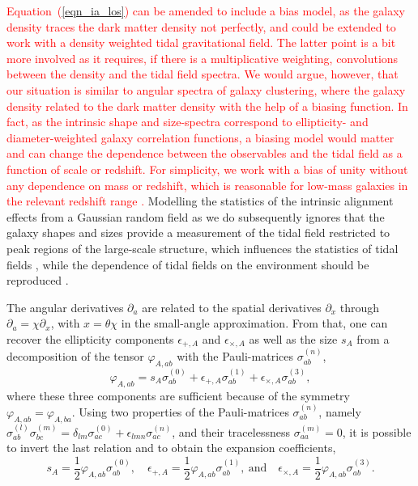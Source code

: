 \documentclass[a4paper,fleqn,usenatbib]{mnras}
\newcommand\spirou[1]{\textcolor{red}{#1}}
\begin{document}
\spirou{Equation~(\ref{eqn_ia_los}) can be amended to include a bias model, as the galaxy density traces the dark matter density not perfectly, and could be extended to work with a density weighted tidal gravitational field. The latter point is a bit more involved as it requires, if there is a multiplicative weighting, convolutions between the density and the tidal field spectra. We would argue, however, that our situation is similar to angular spectra of galaxy clustering, where the galaxy density related to the dark matter density with the help of a biasing function. In fact, as the intrinsic shape and size-spectra correspond to ellipticity- and diameter-weighted galaxy correlation functions, a biasing model would matter and can change the dependence between the observables and the tidal field as a function of scale or redshift. For simplicity, we work with a bias of unity without any dependence on mass or redshift, which is reasonable for low-mass galaxies in the relevant redshift range \citep{sheth_large-scale_1999}.} Modelling the statistics of the intrinsic alignment effects from a Gaussian random field as we do subsequently ignores that the galaxy shapes and sizes provide a measurement of the tidal field restricted to peak regions of the large-scale structure, which influences the statistics of tidal fields \citep{peacock_statistics_1985, schafer_galactic_2012}, while the dependence of tidal fields on the environment should be reproduced \citep{forero-romero_cosmic_2014, reischke_environmental_2018}.

The angular derivatives $\partial_a$ are related to the spatial derivatives $\partial_x$ through $\partial_a = \chi\partial_x$, with $x=\theta\chi$ in the small-angle approximation. From that, one can recover the ellipticity components $\epsilon_{+,A}$ and $\epsilon_{\times,A}$ as well as the size $s_A$ from a decomposition of the tensor $\varphi_{A,ab}$ with the Pauli-matrices $\sigma_{ab}^{(n)}$,
\begin{equation}
\varphi_{A,ab} = s_A\sigma^{(0)}_{ab} + \epsilon_{+,A}\sigma^{(1)}_{ab} + \epsilon_{\times,A}\sigma^{(3)}_{ab},
\end{equation}
where these three components are sufficient because of the symmetry $\varphi_{A,ab} = \varphi_{A,ba}$. Using two properties of the Pauli-matrices $\sigma_{ab}^{(n)}$, namely $\sigma_{ab}^{(l)}\sigma_{bc}^{(m)} = \delta_{lm}\sigma^{(0)}_{ac} + \epsilon_{lmn}\sigma^{(n)}_{ac}$, and their tracelessness $\sigma^{(m)}_{aa} = 0$, it is possible to invert the last relation and to obtain the expansion coefficients,
\begin{equation}
s_A = \frac{1}{2}\varphi_{A,ab}\sigma^{(0)}_{ab},
\quad
\epsilon_{+,A} = \frac{1}{2}\varphi_{A,ab}\sigma^{(1)}_{ab},
\mathrm{~and}\quad
\epsilon_{\times,A} = \frac{1}{2}\varphi_{A,ab}\sigma^{(3)}_{ab}.
\end{equation}
\end{document}
